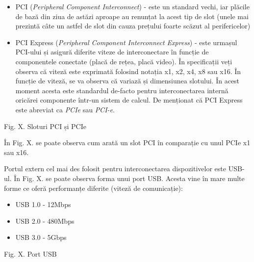 \begin{itemize}
	\item PCI 
		(\textit{Peripheral Component Interconnect}) - este un standard
		vechi, iar plăcile de bază din ziua de astăzi aproape au
		renunțat la acest tip de slot (unele mai prezintă câte un astfel
		de slot din cauza prețului foarte scăzut al perifericelor)
	\item PCI Express (\textit{Peripheral Component Interconnect Express}) -
		este urmașul PCI-ului și asigură diferite viteze de
		interconectare în funcție de componentele conectate (placă de
		rețea, placă video). În specificații veți observa că viteză
		este exprimată folosind notația x1, x2, x4, x8 sau x16. În
		funcție de viteză, se va observa că variază și dimensiunea
		slotului. În acest moment acesta este standardul de-facto pentru
		interconectarea internă oricărei componente într-un sistem de
		calcul. De menționat că PCI Express este abreviat ca
		\textit{PCIe} sau \textit{PCI-e}.
\end{itemize}

Fig. X. Sloturi PCI și PCIe

În Fig. X. se poate observa cum arată un slot PCI în comparație cu unul PCIe x1
sau x16.

Portul extern cel mai des folosit pentru interconectarea dispozitivelor este
USB-ul. În Fig. X. se poate observa forma unui port USB. Acesta vine în mare
multe forme ce oferă performanțe diferite (viteză de comunicație):

\begin{itemize}
	\item USB 1.0 - 12Mbps
	\item USB 2.0 - 480Mbps
	\item USB 3.0 - 5Gbps
\end{itemize}

Fig. X. Port USB

